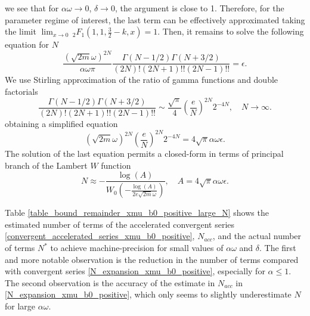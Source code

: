 \documentclass[10pt,a4paper,oneside]{article}
\numberwithin{equation}{section}
\begin{document}
we see that for $\alpha \omega \to 0$, $\delta \to 0$, the argument is close to 1. Therefore, for the parameter regime of interest, the last term can be effectively approximated taking the limit $\lim_{x \to 0}\, _2F_1\left(1, 1, \frac{3}{2}-k, x\right) = 1$. Then, it remains to solve the following equation for $N$ 
\begin{equation}
\frac{(\sqrt{2m} \omega)^{2N}}{\alpha\omega \pi} \frac{\Gamma(N - 1/2)\Gamma(N + 3/2)}{(2N)!(2N + 1)!! (2N - 1)!!} = \epsilon.
\end{equation}
We use Stirling approximation of the ratio of gamma functions and double factorials
\begin{equation}
\frac{\Gamma(N - 1/2)\Gamma(N + 3/2)}{(2N)!(2N + 1)!! (2N - 1)!!} \sim \frac{\sqrt{\pi}}{4} \left(\frac{e}{N}\right)^{2N} 2^{-4N}, \quad N \to \infty.
\end{equation}
obtaining a simplified equation
\begin{equation}
(\sqrt{2m} \omega)^{2N} \left(\frac{e}{N}\right)^{2N} 2^{-4N} = 4\sqrt{\pi}\alpha\omega\epsilon.
\end{equation}
The solution of the last equation permits a closed-form in terms of principal branch of the Lambert $W$ function
\begin{equation}\label{N_expansion_xmu_acc}
N \approx - \frac{\log(A)}{W_0\left(-\frac{\log(A)}{2 e \sqrt{2m} \omega} \right)}, \quad A = 4\sqrt{\pi}\alpha\omega\epsilon.
\end{equation}

Table \ref{table_bound_remainder_xmu_b0_positive_large_N} shows the estimated number of terms of the accelerated convergent series \eqref{convergent_accelerated_series_xmu_b0_positive}, $N_{acc}$, and the actual number of terms $N^*$ to achieve machine-precision for small values of $\alpha\omega$ and $\delta$. The first and more notable observation is the reduction in the number of terms compared with convergent series \eqref{N_expansion_xmu_b0_positive}, especially for $\alpha \le 1$. The second observation is the accuracy of the estimate in $N_{acc}$ in \eqref{N_expansion_xmu_b0_positive}, which only seems to slightly underestimate $N$ for large $\alpha\omega$.
\end{document}
